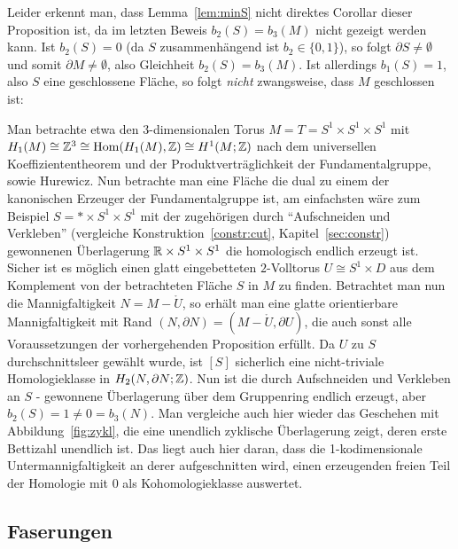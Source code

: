 \begin{bem}
    Leider erkennt man, dass Lemma~\ref{lem:minS} nicht direktes Corollar dieser Proposition ist, da im letzten Beweis $b_2(S)=b_3(M)$ nicht gezeigt werden kann. Ist $b_2(S)=0$ (da $S$ zusammenhängend ist $b_2 \in \{0,1\}$), so folgt $\partial S \neq \emptyset$ und somit $\partial M \neq \emptyset$, also Gleichheit $b_2(S)=b_3(M)$. Ist allerdings $b_1(S)=1$, also $S$ eine geschlossene Fläche, so folgt \emph{nicht} zwangsweise, dass $M$ geschlossen ist:
\end{bem}
    \begin{bsp}
     Man betrachte etwa den 3-dimensionalen Torus $M=T=S^1\times S^1 \times S^1$ mit $H_1(M)\cong\mathbb{Z}^3 \cong \operatorname{Hom}(H_1(M),\mathbb{Z}) \cong H^1(M;\mathbb{Z})$ nach dem universellen Koeffiziententheorem und der Produktverträglichkeit der Fundamentalgruppe, sowie Hurewicz. Nun betrachte man eine Fläche die dual zu einem der kanonischen Erzeuger der Fundamentalgruppe ist, am einfachsten wäre zum Beispiel $S=* \times S^1 \times S^1$ mit der zugehörigen durch "`Aufschneiden und Verkleben"' (vergleiche Konstruktion~\ref{constr:cut}, Kapitel~\ref{sec:constr}) gewonnenen Überlagerung $\mathbb{R} \times S^1 \times S^1$ die homologisch endlich erzeugt ist. Sicher ist es möglich einen glatt eingebetteten $2$-Volltorus $U\cong S^1\times D$ aus dem Komplement von der betrachteten Fläche $S$ in $M$ zu finden. Betrachtet man nun die Mannigfaltigkeit $N=M - \mathring U$, so erhält man eine glatte orientierbare Mannigfaltigkeit mit Rand $(N,\partial N)= (M- \mathring U, \partial U)$, die auch sonst alle Voraussetzungen der vorhergehenden Proposition erfüllt. Da $U$ zu $S$ durchschnittsleer gewählt wurde, ist $[S]$ sicherlich eine nicht-triviale Homologieklasse in $H_2(N,\partial N;\mathbb{Z})$. Nun ist die durch Aufschneiden und Verkleben an $S$ - gewonnene Überlagerung über dem Gruppenring endlich erzeugt, aber $b_2(S)=1 \neq 0 = b_3(N)$. Man vergleiche auch hier wieder das Geschehen mit Abbildung~\ref{fig:zykl}, die eine unendlich zyklische Überlagerung zeigt, deren erste Bettizahl unendlich ist. Das liegt auch hier daran, dass die 1-kodimensionale Untermannigfaltigkeit an derer aufgeschnitten wird, einen erzeugenden freien Teil der Homologie mit 0 als Kohomologieklasse auswertet.
    
    \end{bsp}

    \subsection{Faserungen}
    \label{sec:fibrations}

